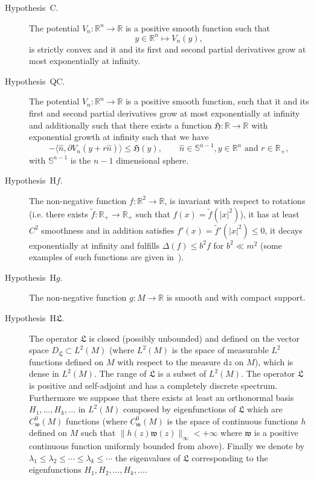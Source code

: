 \documentclass[a4paper,10pt]{article}
\newcommand{\mathd}{\mathrm{d}}
\newcommand{\descriptionparagraphs}[1]{\begin{description}#1\end{description}}
\begin{document}
{\descriptionparagraphs{
  \item[Hypothesis~C.] The potential $V_n : \mathbb{R}^n \rightarrow
  \mathbb{R}$ is a positive smooth function such that
  \[ y \in \mathbb{R}^n \mapsto V_n (y), \]
  is strictly convex and it and its first and second partial derivatives grow
  at most exponentially at infinity.
  
  \item[Hypothesis~QC.] The potential $V_n : \mathbb{R}^n \rightarrow
  \mathbb{R}$ is a positive smooth function, such that it and its first and
  second partial derivatives grow at most exponentially at infinity and
  additionally such that there exists a function $\mathfrak{H} : \mathbb{R}
  \rightarrow \mathbb{R}$ with exponential growth at infinity such that we
  have
  \[ - \langle \hat{n}, \partial V_n (y + r \hat{n}) \rangle \leqslant
     \mathfrak{H} (y), \qquad \text{$\hat{n} \in \mathbb{S}^{n - 1}, y \in
     \mathbb{R}^n$ and $r \in \mathbb{R}_+$}, \]
  with $\mathbb{S}^{n - 1}$ is the $n - 1$ dimensional sphere.
  
  \item[Hypothesis~H$f$.] The non-negative function $f : \mathbb{R}^2
  \rightarrow \mathbb{R}$, is invariant with respect to rotations (i.e. there
  exists $\tilde{f} : \mathbb{R}_+ \rightarrow \mathbb{R}_+$ such that $f (x)
  = \tilde{f} (| x |^2)$), it has at least $C^2$ smoothness and in addition
  satisfies $f' (x) = \tilde{f}' (| x |^2) \leqslant 0$, it decays
  exponentially at infinity and fulfills $\Delta (f) \leqslant b^2 f$ for $b^2
  \ll m^2$ (some examples of such functions are given in~{\cite{Klein1984}}).
  
  \item[Hypothesis~H$g$.] The non-negative function $g : M \rightarrow
  \mathbb{R}$ is smooth and with compact support.
  
  \item[Hypothesis~H$\mathfrak{L}$.] The operator $\mathfrak{L}$ is closed
  (possibly unbounded) and defined on the vector space $D_{\mathfrak{L}}
  \subset L^2 (M)$ (where $L^2 (M)$ is the space of measurable $L^2$ functions
  defined on $M$ with respect to the measure $\mathd z$ on $M$), which is
  dense in $L^2 (M)$. The range of $\mathfrak{L}$ is a subset of $L^2 (M)$.
  The operator $\mathfrak{L}$ is positive and self-adjoint and has a
  completely discrete spectrum. Furthermore we suppose that there exists at
  least an orthonormal basis $H_1, \ldots, H_k, \ldots$ in $L^2 (M)$ composed
  by eigenfunctions of $\mathfrak{L}$ which are $C^0_{\mathfrak{w}} (M)$
  functions (where $C^0_{\mathfrak{w}} (M)$ is the space of continuous
  functions $h$ defined on $M$ such that $\| h (z) \mathfrak{w} (z)
  \|_{\infty} < + \infty$ where $\mathfrak{w}$ is a positive continuous
  function uniformly bounded from above). Finally we denote by $\lambda_1
  \leqslant \lambda_2 \leqslant \cdots \leqslant \lambda_k \leqslant \cdots$
  the eigenvalues of $\mathfrak{L}$ corresponding to the eigenfunctions $H_1,
  H_2, \ldots, H_k, \ldots$.
  
}}
\end{document}
